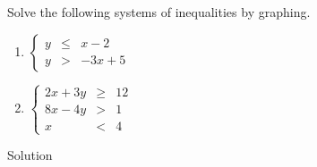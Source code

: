 \begin{example}\label{graphing_syst_lin_ineq_ex1}
Solve the following systems of inequalities by graphing.
\begin{multicols}{2}
\begin{enumerate}
\item $\left\{ \begin{array}{rcl} y &\leq& x-2 \\ y &>& -3x+5  \end{array} \right. $
\item $\left\{ \begin{array}{rcl} 2x+3y &\geq& 12 \\ 8x-4y &>& 1 \\ x &<& 4  \end{array} \right. $
\end{enumerate}
\end{multicols}


Solution 


\end{example}
